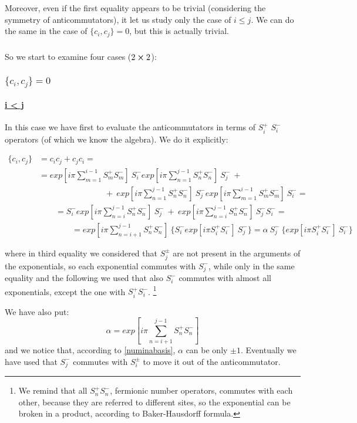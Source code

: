Moreover, even if the first equality appears to be trivial (considering the symmetry of anticommutators), it let us study only the case of $i \leq j$.
We can do the same in the case of $ \{c_i, c_j\} = 0$, but this is actually trivial.

\subparagraph{}So we start to examine four cases ($2 \cross 2$):

\subsubsection{$\{c_i, c_j\} = 0$}

\paragraph{\underline{i < j}} In this case we have first to evaluate the anticommutators in terms of $S_i^+$ $S_i^-$ operators (of which we know the algebra). We do it explicitly:

\begin{align*}
\{c_i, c_j\} &= c_i c_j + c_j c_i =\\
&= exp[i\pi \sum_{m=1}^{i-1} S_m^+ S_m^-]~S_i^- exp[i\pi \sum_{n=1}^{j-1} S_n^+ S_n^-]~S_j^- ~+\\
&\qquad \qquad \qquad \qquad +~ exp[i\pi \sum_{n=1}^{j-1} S_n^+ S_n^-]~S_j^- exp[i\pi \sum_{m=1}^{i-1} S_m^+ S_m^-]~S_i^- =\\
& \qquad  = S_i^- exp[i\pi \sum_{n=i}^{j-1} S_n^+ S_n^-]~S_j^- ~+~ exp[i\pi \sum_{n=i}^{j-1} S_n^+ S_n^-]~S_j^- S_i^- =\\
& \qquad \qquad = exp[i\pi \sum_{n=i+1}^{j-1} S_n^+ S_n^-]~ \{S_i^- exp[i\pi S_i^+ S_i^-]~S_j^-\} = \alpha ~S_j^- ~\{exp[i\pi S_i^+ S_i^-]~S_i^-\}
\end{align*}

\noindent where in third equality we considered that $S_j^{\pm}$ are not present in the arguments of the exponentials, so each exponential commutes with $S_j^{-}$, while only in the same equality and the following we used that also $S_i^{-}$ commutes with almost all exponentials, except the one with $ S_i^+ S_i^-$.
\footnote{We remind that all $ S_n^+ S_n^-$, fermionic number operators, commutes with each other, because they are referred to different sites, so the exponential can be broken in a product, according to Baker-Hausdorff formula.}

We have also put: 
\begin{equation*}
\alpha = exp[i\pi \sum_{n=i+1}^{j-1} S_n^+ S_n^-]
\end{equation*}
\noindent and we notice that, according to \cref{numinabasis}, $\alpha$ can be only $\pm 1$. Eventually we have used that $S_j^-$ commutes with $S_i^{\pm}$ to move it out of the anticommutator.

